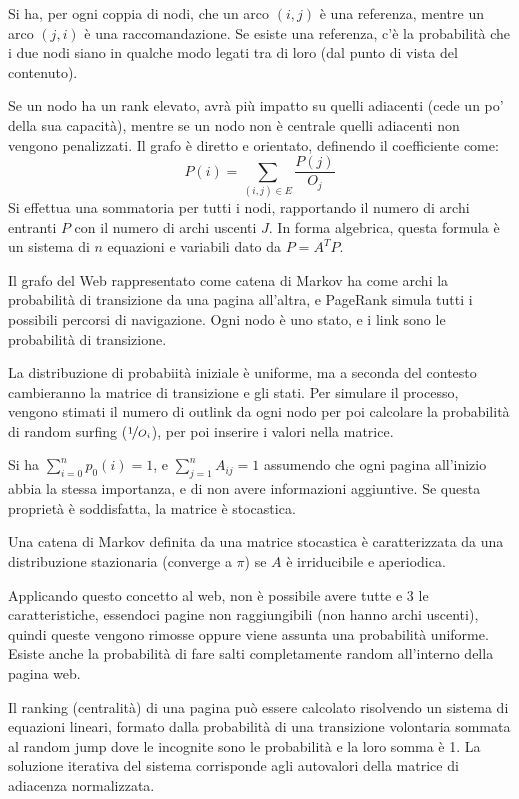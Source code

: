 Si ha, per ogni coppia di nodi, che un arco $(i, j)$ è una referenza, mentre un arco $(j, i)$ è una raccomandazione. Se esiste una referenza, c'è la probabilità che i due nodi siano in qualche modo legati tra di loro (dal punto di vista del contenuto).

Se un nodo ha un rank elevato, avrà più impatto su quelli adiacenti (cede un po' della sua capacità), mentre se un nodo non è centrale quelli adiacenti non vengono penalizzati. Il grafo è diretto e orientato, definendo il coefficiente come:
$$P(i) = \sum_{(i, j) \in E} \frac{P(j)}{O_j}$$
Si effettua una sommatoria per tutti i nodi, rapportando il numero di archi entranti $P$ con il numero di archi uscenti $J$. In forma algebrica, questa formula è un sistema di $n$ equazioni e variabili dato da $P = A^TP$.

Il grafo del Web rappresentato come catena di Markov ha come archi la probabilità di transizione da una pagina all'altra, e PageRank simula tutti i possibili percorsi di navigazione. Ogni nodo è uno stato, e i link sono le probabilità di transizione. 

La distribuzione di probabiità iniziale è uniforme, ma a seconda del contesto cambieranno la matrice di transizione e gli stati. Per simulare il processo, vengono stimati il numero di outlink da ogni nodo per poi calcolare la probabilità di random surfing ($\nicefrac{1}{O_i}$), per poi inserire i valori nella matrice.

Si ha $\sum_{i=0}^{n} p_0(i) = 1$, e $\sum_{j=1}^{n} A_{ij}  = 1$ assumendo che ogni pagina all'inizio abbia la stessa importanza, e di non avere informazioni aggiuntive. Se questa proprietà è soddisfatta, la matrice è stocastica. 

Una catena di Markov definita da una matrice stocastica è caratterizzata da una distribuzione stazionaria (converge a $\pi$) se $A$ è irriducibile e aperiodica. 

Applicando questo concetto al web, non è possibile avere tutte e 3 le caratteristiche, essendoci pagine non raggiungibili (non hanno archi uscenti), quindi queste vengono rimosse oppure viene assunta una probabilità uniforme. Esiste anche la probabilità di fare salti completamente random all'interno della pagina web. 

Il ranking (centralità) di una pagina può essere calcolato risolvendo un sistema di equazioni lineari, formato dalla probabilità di una transizione volontaria sommata al random jump dove le incognite sono le probabilità e la loro somma è 1. La soluzione iterativa del sistema corrisponde agli autovalori della matrice di adiacenza normalizzata. 

